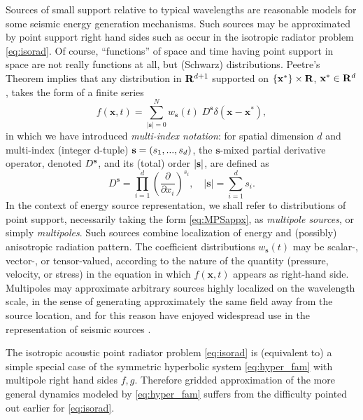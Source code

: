 Sources of small support relative to typical wavelengths are reasonable models
for some seismic energy generation mechanisms. Such sources may be
approximated by point support right hand sides such as occur in the
isotropic radiator problem \ref{eq:isorad}. Of course, ``functions''
of space and time having point support in space are not really
functions at all, but (Schwarz) distributions. 
Peetre's Theorem \cite[]{Horm:69} implies that any distribution in
${\bf R}^{d+1}$ 
supported on $\{\mathbf x^* \} \times {\bf R}$, ${\bf x^*} \in {\bf R}^d$, takes the form of a finite series
\begin{equation}\label{eq:MPSappx}
        f(\mathbf x,t) = \sum_{|\mathbf s|=0}^N w_{\mathbf s}(t) \; D^{\mathbf s}\delta(\mathbf x-\mathbf x^*),
\end{equation}
in which we have introduced {\em multi-index notation}: for spatial
dimension $d$ and multi-index (integer d-tuple) ${\bf s} =
(s_1,...,s_d)$, the $\mathbf s$-mixed partial derivative operator, denoted $D^{\bf s}$,
and its (total) order $|{\bf s}|$, are defined as
\begin{equation}\label{eq:PDO}
        D^{\mathbf s} = \prod_{i=1}^d \left( \frac{\partial}{\partial x_i}\right)^{s_i}, \quad |\mathbf s| = \sum_{i=1}^{d} s_i.
\end{equation}
In the context of energy source representation, we shall refer to
distributions of point support, necessarily taking the form
\ref{eq:MPSappx}, as {\em multipole sources}, or simply {\em multipoles}.
Such sources combine
localization of energy and (possibly) anisotropic radiation pattern.
The coefficient distributions $w_{\mathbf s}(t)$ may be scalar-, vector-, or
tensor-valued, according to the nature of the quantity (pressure, velocity, or stress) 
in the equation in which
$f(\mathbf x,t)$ appears as right-hand side.  Multipoles may
approximate arbitrary sources highly localized on the wavelength scale, in
the sense of generating approximately the same field away from the
source location, and for this reason have enjoyed widespread use in
the representation of seismic sources \cite[]{Shearer:2009}.

The isotropic acoustic point radiator problem \ref{eq:isorad} is
(equivalent to) a
simple special case of the symmetric hyperbolic system
\ref{eq:hyper_fam} with multipole
right hand sides $f,g$. Therefore gridded approximation of the more general
dynamics modeled by \ref{eq:hyper_fam} suffers from the difficulty
pointed out earlier for \ref{eq:isorad}. 

